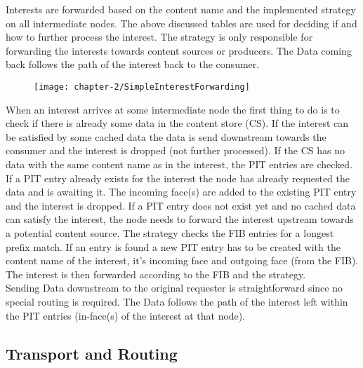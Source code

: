 Interests are forwarded based on the content name and the implemented strategy on all intermediate nodes. The above discussed tables are used for deciding if and how to further process the interest. The strategy is only responsible for forwarding the interests towards content sources or producers. The Data coming back follows the path of the interest back to the consumer.

\begin{figure}[h]
\texttt{[image: chapter-2/SimpleInterestForwarding]}
\centering
\end{figure}

When an interest arrives at some intermediate node the first thing to do is to check if there is already some data in the content store (CS). If the interest can be satisfied by some cached data the data is send downstream towards the consumer and the interest is dropped (not further processed). If the CS has no data with the same content name as in the interest, the PIT entries are checked. If a PIT entry already exists for the interest the node has already requested the data and is awaiting it. The incoming face(s) are added to the existing PIT entry and the interest is dropped. If a PIT entry does not exist yet and no cached data can satisfy the interest, the node needs to forward the interest upstream towards a potential content source. The strategy checks the FIB entries for a longest prefix match. If an entry is found a new PIT entry has to be created with the content name of the interest, it's incoming face and outgoing face (from the FIB). The interest is then forwarded according to the FIB and the strategy.
\\
Sending Data downstream to the original requester is straightforward since no special routing is required. The Data follows the path of the interest left within the PIT entries (in-face(s) of the interest at that node). 

\subsection{Transport and Routing}

